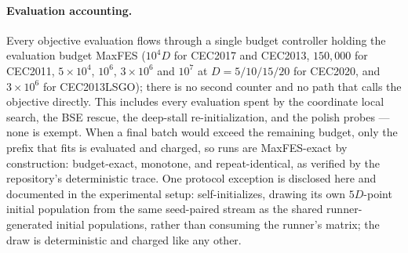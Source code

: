 \paragraph{Evaluation accounting.}
Every objective evaluation flows through a single
budget controller holding the evaluation budget MaxFES ($10^{4}D$ for
CEC2017 and CEC2013, $150{,}000$ for CEC2011, $5\times10^{4}$,
$10^{6}$, $3\times10^{6}$ and $10^{7}$ at $D = 5/10/15/20$ for CEC2020,
and $3\times10^{6}$ for CEC2013LSGO); there is
no second counter and no path that calls the objective
directly. %
This includes every evaluation spent by the coordinate local search, the
BSE rescue, the deep-stall re-initialization, and the polish probes
--- none is exempt.
When a final batch would exceed the remaining budget, only the prefix
that fits is evaluated and charged, so runs are MaxFES-exact by
construction: budget-exact, monotone, and repeat-identical, as
verified by the repository's deterministic
trace. %
One protocol exception is disclosed here and documented in the
experimental setup: \dtgsk{} self-initializes, drawing its own
$5D$-point initial population from the same seed-paired stream as the
shared runner-generated initial populations, rather than consuming the
runner's matrix; the draw is deterministic and charged like any
other. %
